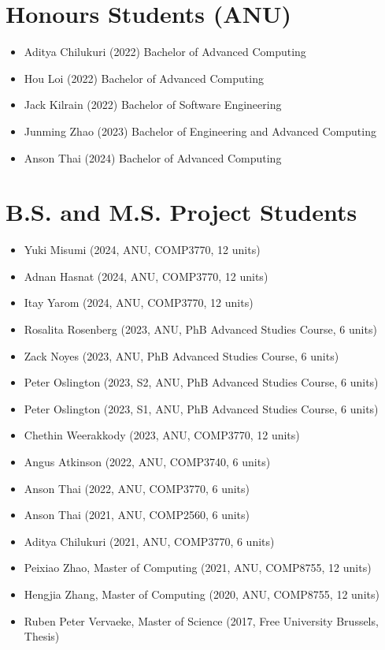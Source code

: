\documentclass[singlecolumn,singlespace,11pt]{article}
\begin{document}
\section*{Honours Students (ANU)}

\begin{itemize}

\item Aditya Chilukuri (2022) Bachelor of Advanced Computing 
\item Hou Loi (2022) Bachelor of Advanced Computing 
\item Jack Kilrain (2022) Bachelor of Software Engineering 
\item Junming Zhao (2023) Bachelor of Engineering and Advanced Computing 
\item Anson Thai (2024) Bachelor of Advanced Computing

\end{itemize}

\section*{B.S. and M.S. Project Students}

\begin{itemize}

\item Yuki Misumi (2024, ANU, COMP3770, 12 units)
\item Adnan Hasnat (2024, ANU, COMP3770, 12 units)
\item Itay Yarom (2024, ANU, COMP3770, 12 units)
\item Rosalita Rosenberg (2023, ANU, PhB Advanced Studies Course, 6 units)
\item Zack Noyes (2023, ANU, PhB Advanced Studies Course, 6 units)
\item Peter Oslington (2023, S2, ANU, PhB Advanced Studies Course, 6 units)
\item Peter Oslington (2023, S1, ANU, PhB Advanced Studies Course, 6 units)
\item Chethin Weerakkody (2023, ANU, COMP3770, 12 units)
\item Angus Atkinson (2022, ANU, COMP3740, 6 units)
\item Anson Thai (2022, ANU, COMP3770, 6 units)
\item Anson Thai (2021, ANU, COMP2560, 6 units)
\item Aditya Chilukuri (2021, ANU, COMP3770, 6 units)
\item Peixiao Zhao, Master of Computing (2021, ANU, COMP8755, 12 units)
\item Hengjia Zhang, Master of Computing (2020, ANU, COMP8755, 12 units) 
\item Ruben Peter Vervaeke, Master of Science (2017, Free University Brussels, Thesis)

\end{itemize}
\end{document}
